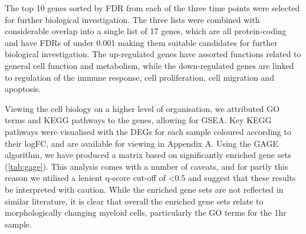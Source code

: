 The top 10 genes sorted by \ac{FDR} from each of the three time points were selected for further biological investigation. The three lists were combined with considerable overlap into a single list of 17 genes, which are all protein-coding and have \ac{FDR}s of under 0.001 making them suitable candidates for further biological investigation. The up-regulated genes have assorted functions related to general cell function and metabolism, while the down-regulated genes are linked to regulation of the immune response, cell proliferation, cell migration and apoptosis.

Viewing the cell biology on a higher level of organisation, we attributed \ac{GO} terms and \ac{KEGG} pathways to the genes, allowing for \ac{GSEA}. Key \ac{KEGG} pathways were visualised with the \ac{DEG}s for each sample coloured according to their \ac{logFC}, and are available for viewing in Appendix A. Using the GAGE algorithm, we have produced a matrix based on significantly enriched gene sets (\autoref{tab:gage}). This analysis comes with a number of caveats, and for partly this reason we utilised a lenient q-score cut-off of <0.5 and suggest that these results be interpreted with caution. While the enriched gene sets are not reflected in similar literature, it is clear that overall the enriched gene sets relate to morphologically changing myeloid cells, particularly the \ac{GO} terms for the 1hr sample.


\enlargethispage{\baselineskip} %
